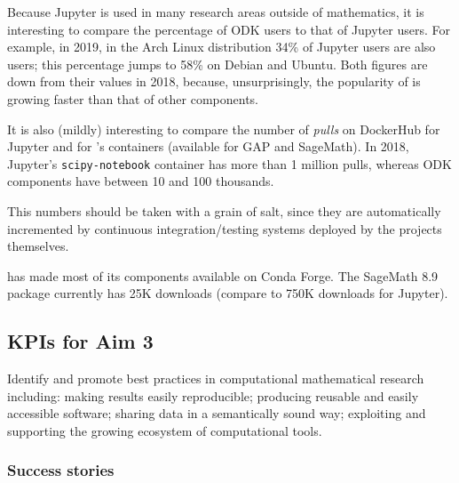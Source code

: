 \begin{enumerate}
  Because Jupyter is used in many research areas outside of
  mathematics, it is interesting to compare the percentage of ODK
  users to that of Jupyter users. For example, in 2019, in the Arch
  Linux distribution 34\% of Jupyter users are also \ODK users; this
  percentage jumps to 58\% on Debian and Ubuntu. Both figures are down
  from their values in 2018, because, unsurprisingly, the popularity
  of \Jupyter is growing faster than that of other \ODK components.
  
  \noindent
  It is also (mildly) interesting to compare the number of
  \emph{pulls} on DockerHub for Jupyter and for \ODK's containers
  (available for GAP and SageMath). In 2018, Jupyter's
  \texttt{scipy-notebook} container has more than 1 million pulls,
  whereas ODK components have between 10 and 100 thousands.

  \noindent
  This numbers should be taken with a grain of salt, since they are
  automatically incremented by continuous integration/testing systems
  deployed by the projects themselves.

  \noindent
  \ODK has made most of its components available on Conda Forge. The
  SageMath 8.9 package currently has 25K downloads (compare to 750K
  downloads for Jupyter).
\end{enumerate}

\subsection{KPIs for Aim 3}

\begin{aim}
  Identify and promote best practices in computational mathematical research including: making results easily reproducible; producing
  reusable and easily accessible software; sharing data in a semantically sound way; exploiting and supporting the growing
  ecosystem of computational tools.
\end{aim}

\subsubsection{Success stories}

